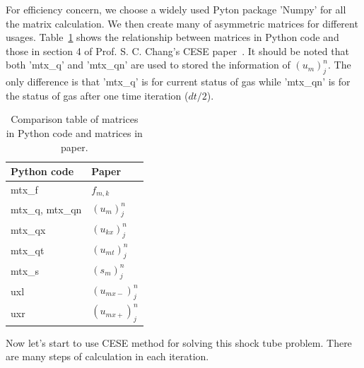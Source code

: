\documentclass[a4paper,12pt,dvips]{article}
\begin{document}
For efficiency concern, we choose a widely used Pyton package 'Numpy' for all the 
matrix calculation. We then create many of asymmetric matrices for different usages. 
Table~\ref{tab:mtx_comparision} shows the relationship between matrices in Python 
code and those in section 4 of Prof. S. C. Chang's CESE paper~\cite{CESE_Shin_Chung_Chang_1995}. 
It should be noted that both 'mtx\_q' and 'mtx\_qn' are used to stored the 
information of $(u_{m})^{n}_{j}$. The only difference is that 'mtx\_q' is for 
current status of gas while 'mtx\_qn' is for the status of gas after one time 
iteration ($dt/2$).

\begin{table}[ht]
\begin{center}
\caption{Comparison table of matrices in Python code and matrices in paper. 
        \label{tab:mtx_comparision}}
\begin{tabular}{l|l}
\hline\hline
Python code         & Paper \\\hline
mtx\_f              & $f_{m,k}$ \\
mtx\_q, mtx\_qn     & $(u_{m})^{n}_{j}$ \\ 
mtx\_qx             & $(u_{kx})^{n}_{j}$ \\
mtx\_qt             & $(u_{mt})^{n}_{j}$ \\
mtx\_s              & $(s_{m})^{n}_{j}$ \\
uxl                 & $(u_{mx-})^{n}_{j}$ \\
uxr                 & $(u_{mx+})^{n}_{j}$ \\
\hline\hline
\end{tabular}
\end{center}
\end{table}

Now let's start to use CESE method for solving this shock tube problem. 
There are many steps of calculation in each iteration.
\end{document}
